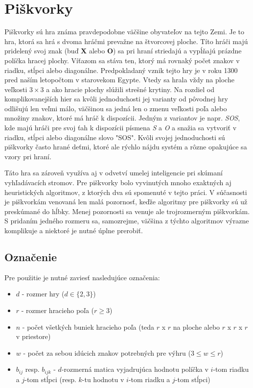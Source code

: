 \section{Piškvorky}\label{sec:tic-tac-toe}

Piškvorky sú hra známa pravdepodobne väčšine obyvateľov na tejto Zemi.
Je to hra, ktorá sa hrá s dvoma hráčmi prevažne na štvorcovej ploche.
Títo hráči majú pridelený svoj znak (buď \textbf{X} alebo \textbf{O}) sa pri hraní striedajú a vypĺňajú prázdne políčka
hracej plochy.
Víťazom sa stáva ten, ktorý má rovnaký počet znakov v riadku, stĺpci alebo diagonálne.
Predpokladaný vznik tejto hry je v roku 1300 pred naším letopočtom v starovekom Egypte.
Vtedy sa hrala vždy na ploche veľkosti $3 \times 3$ a ako hracie plochy slúžili strešné krytiny.
Na rozdiel od komplikovanejších hier sa kvôli jednoduchosti jej varianty od pôvodnej hry odlišujú len veľmi málo,
väčšinou sa jedná len o zmenu veľkosti poľa alebo množiny znakov, ktoré má hráč k dispozícii.
Jedným z variantov je napr. \emph{SOS}, kde majú hráči pre svoj ťah k dispozícii písmena \emph{S} a \emph{O} a snažia
sa vytvoriť v riadku, stĺpci alebo diagonálne slovo "SOS".
Kvôli svojej jednoduchosti sú piškvorky často hrané deťmi, ktoré ale rýchlo nájdu systém a rôzne opakujúce sa vzory
pri hraní.

Táto hra sa zároveň využíva aj v odvetví umelej inteligencie pri skúmaní vyhľadávacích stromov.
Pre piškvorky bolo vyvinutých mnoho exaktných aj heuristických algoritmov, z ktorých dva sú spomenuté v tejto práci.
V súčasnosti je piškvorkám venovaná len malá pozornosť, keďže algoritmy pre piškvorky sú už preskúmané do hĺbky.
Menej pozornosti sa venuje ale trojrozmerným piškvorkám.
S pridaním jedného rozmeru sa, samozrejme, väčšina z týchto algoritmov výrazne komplikuje a niektoré je nutné úplne
prerobiť.

\subsection{Označenie}\label{subsec:label}

Pre použitie je nutné zaviesť nasledujúce označenia:
\begin{itemize}
    \item $d$ - rozmer hry ($d \in \{2,3\}$)
    \item $r$ - rozmer hracieho poľa ($r \geq 3$)
    \item $n$ - počet všetkých buniek hracieho poľa (teda $r$ x $r$ na ploche alebo $r$ x $r$ x $r$ v priestore)
    \item $w$ - počet za sebou idúcich znakov potrebných pre výhru ($3 \leq w \leq r$)
    \item $b_{ij}$ resp. $b_{ijk}$ - $d$-rozmerná matica vyjadrujúca hodnotu políčka v $i$-tom riadku a $j$-tom
    stĺpci (resp. $k$-tu hodnotu v $i$-tom riadku a $j$-tom stĺpci)
\end{itemize}

